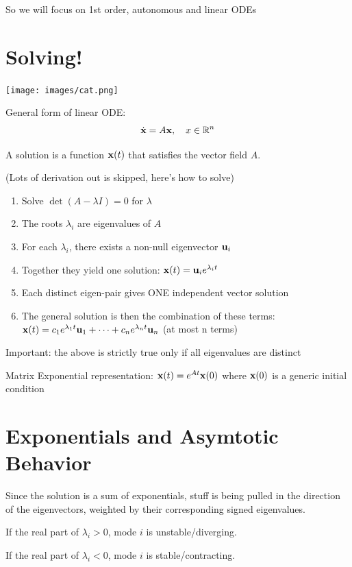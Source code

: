 So we will focus on 1st order, autonomous and linear ODEs

\section*{Solving!}
\begin{center}
    \texttt{[image: images/cat.png]}
\end{center}

General form of linear ODE:
\[
\dot{\mathbf{x}} = A \mathbf{x}, \quad x \in \mathbb{R}^n
\]

A solution is a function $\mathbf{x}(t)$ that satisfies the vector field $A$.

(Lots of derivation out is skipped, here's how to solve)

\begin{enumerate}
    \item Solve $\det(A - \lambda I) = 0$ for $\lambda$
    \item The roots $\lambda_i$ are eigenvalues of $A$
    \item For each $\lambda_i$, there exists a non-null eigenvector
    $\mathbf{u}_i$
    \item Together they yield one solution: $\mathbf{x}(t) = \mathbf{u}_i e^{\lambda_i t}$
    \item Each distinct eigen-pair gives ONE independent vector solution
    \item The general solution is then the combination of these terms:
    $\mathbf{x}(t) = c_1 e^{\lambda_1 t} \mathbf{u}_1 + \dots + c_n e^{\lambda_n t} \mathbf{u}_n$ (at most n terms)
\end{enumerate}

Important: the above is strictly true only if all eigenvalues are distinct

Matrix Exponential representation: $\mathbf{x}(t) = e^{A t} \mathbf{x}(0)$ where $\mathbf{x}(0)$ is a generic initial condition

\section*{Exponentials and Asymtotic Behavior}

Since the solution is a sum of exponentials, stuff is being pulled in the direction of the eigenvectors,
weighted by their corresponding signed eigenvalues.


If the real part of $\lambda_i > 0$, mode $i$ is unstable/diverging.

If the real part of $\lambda_i < 0$, mode $i$ is stable/contracting.

